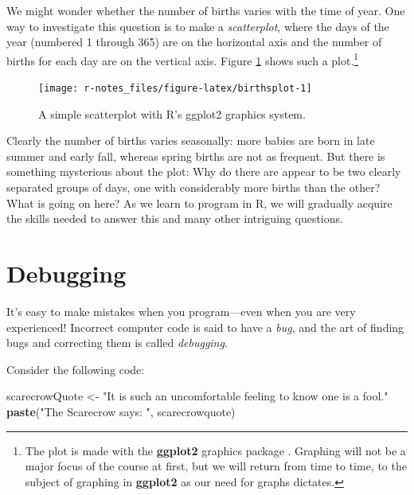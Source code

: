 \documentclass[]{book}
\makeatletter
\newenvironment{Shaded}{\begin{snugshade}}{\end{snugshade}}
\newcommand{\KeywordTok}[1]{\textcolor[rgb]{0.13,0.29,0.53}{\textbf{#1}}}
\newcommand{\StringTok}[1]{\textcolor[rgb]{0.31,0.60,0.02}{#1}}
\newcommand{\NormalTok}[1]{#1}
\let\rmarkdownfootnote\footnote%
\def\footnote{\protect\rmarkdownfootnote}
\newenvironment{kframe}{%
\medskip{}
\setlength{\fboxsep}{.8em}
 \def\at@end@of@kframe{}%
 \ifinner\ifhmode%
  \def\at@end@of@kframe{\end{minipage}}%
  \begin{minipage}{\columnwidth}%
 \fi\fi%
 \def\FrameCommand##1{\hskip\@totalleftmargin \hskip-\fboxsep
 \colorbox{shadecolor}{##1}\hskip-\fboxsep
     \hskip-\linewidth \hskip-\@totalleftmargin \hskip\columnwidth}%
 \MakeFramed {\advance\hsize-\width
   \@totalleftmargin\z@ \linewidth\hsize
   \@setminipage}}%
 {\par\unskip\endMakeFramed%
 \at@end@of@kframe}
\renewenvironment{Shaded}{\begin{kframe}}{\end{kframe}}
\theoremstyle{definition}
\theoremstyle{definition}
\theoremstyle{definition}
\theoremstyle{remark}
\makeatother
\begin{document}
We might wonder whether the number of births varies with the time of
year. One way to investigate this question is to make a
\emph{scatterplot}, where the days of the year (numbered 1 through 365)
are on the horizontal axis and the number of births for each day are on
the vertical axis. Figure \ref{fig:birthsplot} shows such a
plot.\footnote{The plot is made with the \textbf{ggplot2} graphics
  package \citep{R-ggplot2}. Graphing will not be a major focus of the
  course at first, but we will return from time to time, to the subject
  of graphing in \textbf{ggplot2} as our need for graphs dictates.}

\begin{figure}

{\centering \texttt{[image: r-notes\_files/figure-latex/birthsplot-1]} 

}

\caption{A simple scatterplot with R's ggplot2 graphics system.}\label{fig:birthsplot}
\end{figure}

Clearly the number of births varies seasonally: more babies are born in
late summer and early fall, whereas spring births are not as frequent.
But there is something mysterious about the plot: Why do there are
appear to be two clearly separated groups of days, one with considerably
more births than the other? What is going on here? As we learn to
program in R, we will gradually acquire the skills needed to answer this
and many other intriguing questions.

\section{Debugging}\label{idea-debugging}

It's easy to make mistakes when you program---even when you are very
experienced! Incorrect computer code is said to have a \emph{bug}, and
the art of finding bugs and correcting them is called \emph{debugging}.

Consider the following code:

\begin{Shaded}
\begin{Highlighting}[]
\NormalTok{scarecrowQuote <-}\StringTok{ "It is such an uncomfortable feeling to know one is a fool."}
\KeywordTok{paste}\NormalTok{(}\StringTok{"The Scarecrow says: "}\NormalTok{, scarecrowquote)}
\end{Highlighting}
\end{Shaded}
\end{document}
